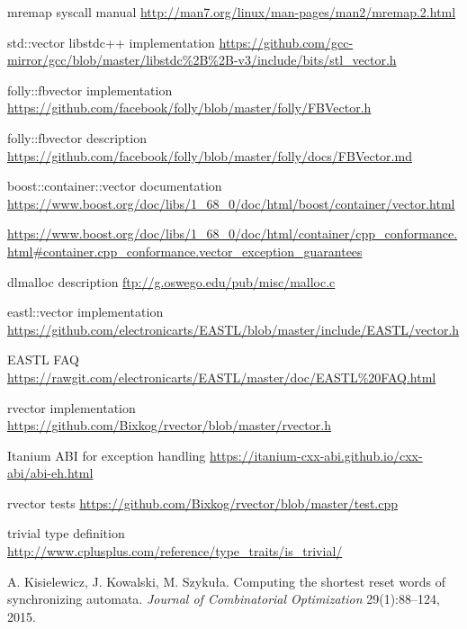 \documentclass[inz, english, shortabstract]{iithesis}
\begin{document}
\begin{thebibliography}{1}
 mremap syscall manual \url{http://man7.org/linux/man-pages/man2/mremap.2.html}

 std::vector libstdc++ implementation \url{https://github.com/gcc-mirror/gcc/blob/master/libstdc%2B%2B-v3/include/bits/stl_vector.h}

 folly::fbvector implementation \url{https://github.com/facebook/folly/blob/master/folly/FBVector.h}

 folly::fbvector description \url{https://github.com/facebook/folly/blob/master/folly/docs/FBVector.md}

 boost::container::vector documentation \url{https://www.boost.org/doc/libs/1_68_0/doc/html/boost/container/vector.html}

 \url{https://www.boost.org/doc/libs/1_68_0/doc/html/container/cpp_conformance.html#container.cpp_conformance.vector_exception_guarantees}

 dlmalloc description \url{ftp://g.oswego.edu/pub/misc/malloc.c}

 eastl::vector implementation \url{https://github.com/electronicarts/EASTL/blob/master/include/EASTL/vector.h}

 EASTL FAQ \url{https://rawgit.com/electronicarts/EASTL/master/doc/EASTL%20FAQ.html}

 rvector implementation \url{https://github.com/Bixkog/rvector/blob/master/rvector.h}

 Itanium ABI for exception handling \url{https://itanium-cxx-abi.github.io/cxx-abi/abi-eh.html}

 rvector tests \url{https://github.com/Bixkog/rvector/blob/master/test.cpp}

 trivial type definition \url{http://www.cplusplus.com/reference/type_traits/is_trivial/}

 A. Kisielewicz, J. Kowalski, M. Szyku{\l}a.  Computing the shortest reset words of synchronizing automata. \emph{Journal of Combinatorial Optimization} 29(1):88--124, 2015.

\end{thebibliography}

\listoffigures
\lstlistoflistings
\end{document}
